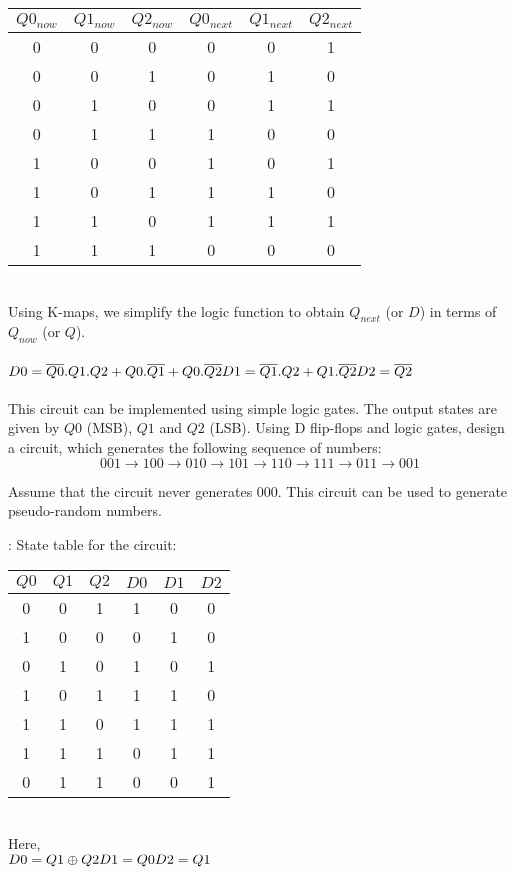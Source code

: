\begin{ExerciseList}
\begin{tabular}{|c|c|c|c|c|c|}
\hline
$Q0_{now}$ & $Q1_{now}$ & $Q2_{now}$ & $Q0_{next}$ & $Q1_{next}$ & $Q2_{next}$ \\
\hline
0 & 0 & 0 & 0 & 0 & 1\\ 
\hline
0 & 0 & 1 & 0 & 1 & 0\\
\hline
0 & 1 & 0 & 0 & 1 & 1\\
\hline
0 & 1 & 1 & 1 & 0 & 0\\
\hline
1 & 0 & 0 & 1 & 0 & 1\\
\hline
1 & 0 & 1 & 1 & 1 & 0\\
\hline
1 & 1 & 0 & 1 & 1 & 1\\
\hline
1 & 1 & 1 & 0 & 0 & 0\\
\hline
\end{tabular} \\


Using K-maps, we simplify the logic function to obtain $Q_{next}$ (or $D$) in terms of $Q_{now}$ (or $Q$).\\
\\
$D0 = \overline {Q0}.Q1.Q2 + Q0.\overline{Q1}+Q0.\overline{Q2}\\
D1 = \overline{Q1}.Q2 + Q1.\overline{Q2}\\
D2 = \overline{Q2}$ \\
\\
This circuit can be implemented using simple logic gates. The output states are given by $Q0$ (MSB), $Q1$ and $Q2$ (LSB).
\Exercise[difficulty=2]
Using D flip-flops and logic gates, design a circuit, which generates the following sequence of numbers:
\[
001 \rightarrow 100 \rightarrow 010 \rightarrow 101 \rightarrow 110
\rightarrow 111 \rightarrow 011 \rightarrow 001 
\]

Assume that the circuit
never generates 000. This circuit can be used to generate pseudo-random numbers.

\Answer:
State table for the circuit:\\

\begin{tabular}{|c|c|c|c|c|c|}
\hline
$Q0$ & $Q1$ & $Q2$ & $D0$ & $D1$ & $D2$ \\
\hline
0 & 0 & 1 & 1 & 0 & 0\\ 
\hline
1 & 0 & 0 & 0 & 1 & 0\\
\hline
0 & 1 & 0 & 1 & 0 & 1\\
\hline
1 & 0 & 1 & 1 & 1 & 0\\
\hline
1 & 1 & 0 & 1 & 1 & 1\\
\hline
1 & 1 & 1 & 0 & 1 & 1\\
\hline
0 & 1 & 1 & 0 & 0 & 1\\
\hline
\end{tabular} \\

Here, \\
$D0 = Q1 \oplus Q2\\
D1 = Q0\\
D2 = Q1$\\


\end{ExerciseList}

